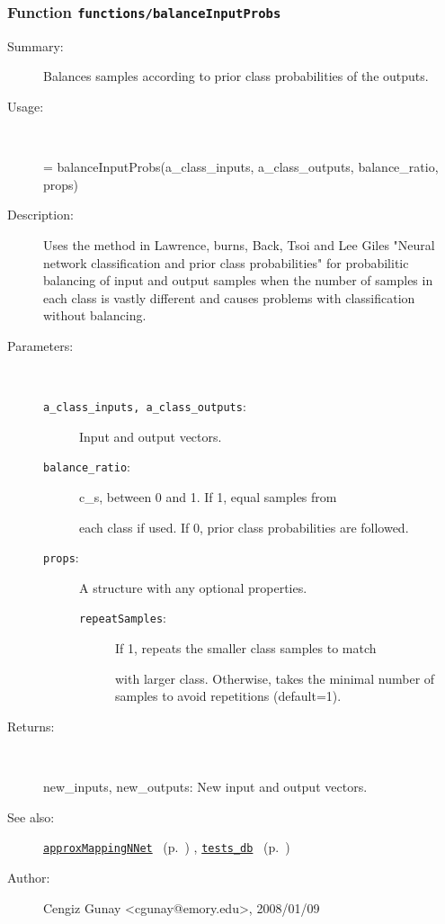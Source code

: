 \subsubsection[Function \texttt{balanceInputProbs}]{Function \texttt{functions/balanceInputProbs}}%
%
\label{ref_functions__balanceInputProbs}%
\hypertarget{ref_functions__balanceInputProbs}{}%
\begin{description}
\item[Summary:]Balances samples according to prior class probabilities of the outputs.
%
\item[Usage:]~%
\begin{lyxcode}%
[new\_inputs, new\_outputs] = balanceInputProbs(a\_class\_inputs, a\_class\_outputs, balance\_ratio, props)
%
\end{lyxcode}%
%
\item[Description:]%
Uses the method in Lawrence, burns, Back, Tsoi and Lee Giles "Neural
 network classification and prior class probabilities" for
 probabilitic balancing of input and output samples when the number of
 samples in each class is vastly different and causes problems with
 classification without balancing.
\item[Parameters:]~
\begin{description}%
\item[\texttt{a\_class\_inputs, a\_class\_outputs}:]
 Input and output vectors.
\item[\texttt{balance\_ratio}:]
 c\_s, between 0 and 1. If 1, equal samples from

each class if used. If 0, prior class probabilities are followed.
\item[\texttt{props}:]
 A structure with any optional properties.
\begin{description}%
\item[\texttt{repeatSamples}:]
 If 1, repeats the smaller class samples to match

with larger class. Otherwise, takes the minimal number of
samples to avoid repetitions (default=1).
\end{description}%
\end{description}%
%
\item[Returns:
]~

	new\_inputs, new\_outputs: New input and output vectors.
%
%
\item[See also:]%
\hyperlink{ref_approxMappingNNet}{\texttt{approxMappingNNet}}%
\ (p.~\pageref{ref_approxMappingNNet})%
%
, \hyperlink{ref_tests_db}{\texttt{tests\_db}}%
\ (p.~\pageref{ref_tests_db})%
%
%
\item[Author:]%
Cengiz Gunay <cgunay@emory.edu>, 2008/01/09
%
\end{description}
\methodline%
